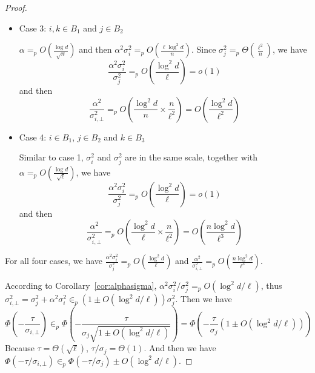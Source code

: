 \begin{proof}
\begin{itemize}
    \item Case 3: $i,k \in B_1$ and $j \in B_2$
    
    $\alpha =_p O\left(\frac{\log d }{\sqrt{n}} \right)$ and then $\alpha^2 \sigma^2_i =_p O\left( \frac{\ell \log^2 d }{n} \right)$. Since $\sigma^2_j =_p \Theta \left( \frac{\ell^2 }{n} \right)$, we have
    \begin{equation}
        \frac{\alpha^2 \sigma^2_i}{\sigma^2_j} =_p O\left(\frac{\log^2 d}{\ell} \right) = o(1)
    \end{equation}
    and then
    \begin{equation}
        \frac{\alpha^2}{\sigma^2_{i,\bot}} =_p  O\left(\frac{\log^2 d }{n} \times \frac{n}{\ell^2} \right) =  O\left(\frac{ \log^2 d }{\ell^2} \right)
    \end{equation}
    \item Case 4: $i \in B_1$, $j \in B_2$ and $k \in B_3$
    
    Similar to case 1, $\sigma^2_i$ and $\sigma^2_j$ are in the same scale, together with $\alpha =_p O\left(\frac{\log d }{\sqrt{\ell}} \right)$, we have
    \begin{equation}
        \frac{\alpha^2 \sigma^2_i}{\sigma^2_j} =_p O\left(\frac{\log^2 d}{\ell} \right) = o(1)
    \end{equation}
    and then
    \begin{equation}
         \frac{\alpha^2}{\sigma^2_{i,\bot}} =_p  O\left(\frac{\log^2 d }{\ell} \times \frac{n}{\ell^2}\right) = O\left(\frac{n \log^2 d}{\ell^{3}}\right)
    \end{equation}
\end{itemize}
For all four cases, we have $\frac{\alpha^2 \sigma^2_i}{\sigma^2_j} =_p O\left(\frac{\log^2 d}{\ell} \right)$ and $\frac{\alpha^2}{\sigma^2_{i,\bot}} =_p O\left(\frac{n \log^2 d}{\ell^{3}}\right)$.


According to Corollary~\ref{cor:alphasigma}, $\alpha^2\sigma^2_i/\sigma^2_j =_p O(\log^2 d/\ell)$, thus $\sigma^2_{i,\bot} = \sigma^2_j + \alpha^2 \sigma^2_i \in_p (1 \pm O(\log^2 d/\ell)) \sigma^2_j$. Then we have 
\begin{equation}
     \Phi\left(-\frac{\tau}{\sigma_{i,\bot}}\right) \in_p \Phi\left(-\frac{\tau}{\sigma_j\sqrt{1 \pm O(\log^2 d/\ell)} }\right)
     = \Phi\left(-\frac{\tau}{\sigma_j}\left(1 \pm O(\log^2 d/\ell)\right)\right) 
\end{equation}
Because $\tau = \Theta\left(\sqrt{\ell}\right)$, $\tau/\sigma_j = \Theta(1)$. And then we have $ \Phi\left(-\tau/ \sigma_{i,\bot}\right) \in_p \Phi\left(-\tau/ \sigma_{j}\right) \pm O(\log^2 d/\ell) $.


\end{proof}
